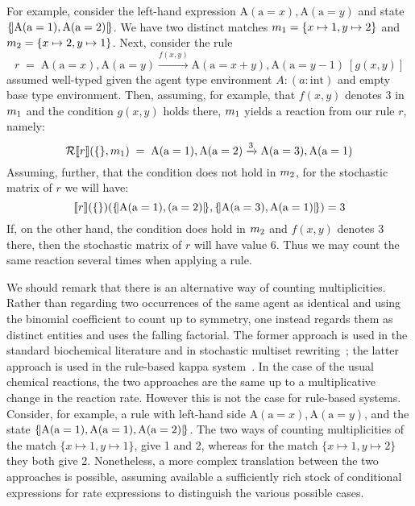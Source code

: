 For example, consider the left-hand expression
$\mathrm{A}(\mathrm{a}=x), \mathrm{A}(\mathrm{a}=y)$ and state
$\{\!|  \mathrm{A}(\mathrm{a}=1),\mathrm{A}(\mathrm{a}=2) |\!\}$. We have two distinct
matches $m_1= \{x \mapsto 1, y \mapsto 2\}$ and
$m_2 = \{x \mapsto 2, y \mapsto 1\}$.
%
Next, consider the rule
%
\[r \;=\; \mathrm{A}(\mathrm{a}=x),\mathrm{A}(\mathrm{a}=y) \xrightarrow{f(x, y)} \mathrm{A}(\mathrm{a}=x+y), \mathrm{A}(\mathrm{a}=y-1) \: [g(x,y)]\]
%
assumed well-typed given the agent type environment $A: (a: \mathrm{int})$ and
empty base type environment.
%
Then, assuming, for example, that $f(x,y)$ denotes 3 in $m_1$ and the
condition $g(x,y)$ holds there, $m_1$ yields a reaction from our rule $r$,
namely:
%
\[\mathcal{R}\llbracket r \rrbracket(\{\},m_1)      \;=\;       \mathrm{A}(\mathrm{a}=1), \mathrm{A}(\mathrm{a}=2) \xrightarrow{3} \mathrm{A}(\mathrm{a}=3), \mathrm{A}(\mathrm{a}=1)\]
%
Assuming, further, that the condition does not hold in $m_2$, for the
stochastic matrix of $r$ we will have:
%
\[\llbracket r \rrbracket(\{\})(\{\!|  \mathrm{A}(\mathrm{a}=1),(\mathrm{a}=2) |\!\},\{\!|  \mathrm{A}(\mathrm{a}=3),\mathrm{A}(\mathrm{a}=1) |\!\}) = 3\]
%
If, on the other hand, the condition does hold in $m_2$ and $f(x,y)$ denotes
3 there, then the stochastic matrix of $r$ will have value 6.  Thus we may count
the same reaction several times when applying a rule.

We should remark that there is an alternative way of counting
multiplicities. Rather than regarding two occurrences of the same agent as
identical and using the binomial coefficient to count up to symmetry, one
instead regards them as distinct entities and uses the falling factorial. The
former approach is used in the standard biochemical literature and in stochastic
multiset rewriting~\citep{anderson_continuous_2011, barbuti_intermediate_2009}; the
latter approach is used in the rule-based kappa system~\cite[Section
4.2.3]{danos_rule-based_2008}.
%
In the case of the usual chemical reactions, the two approaches are the same up
to a multiplicative change in the reaction rate. However this is not the case
for rule-based systems. Consider, for example, a rule with left-hand side
$\mathrm{A}(\mathrm{a}=x),\mathrm{A}(\mathrm{a}=y)$, and the state
$\{\!|  \mathrm{A}(\mathrm{a} =1), \mathrm{A}(\mathrm{a} =1), \mathrm{A}(\mathrm{a}
  = 2) |\!\}$.  The two ways of counting multiplicities of the match
$\{x \mapsto 1,y \mapsto 1\}$, give 1 and 2, whereas for the match
$\{x \mapsto 1,y \mapsto 2\}$ they both give 2.
Nonetheless, a more complex translation between the two approaches is possible,
assuming available a sufficiently rich stock of conditional expressions for rate
expressions to distinguish the various possible cases.

